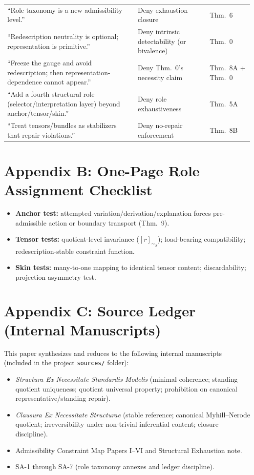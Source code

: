 \documentclass[12pt]{article}
\theoremstyle{plain}
\begin{document}
\begin{longtable}{@{}p{}p{}p{}@{}}
``Role taxonomy is a new admissibility level.'' & Deny exhaustion closure & Thm.\ 6\\
``Redescription neutrality is optional; representation is primitive.'' & Deny intrinsic detectability (or bivalence) & Thm.\ 0\\
``Freeze the gauge and avoid redescription; then representation-dependence cannot appear.'' & Deny Thm.\ 0's necessity claim & Thm.\ 8A + Thm.\ 0\\
``Add a fourth structural role (selector/interpretation layer) beyond anchor/tensor/skin.'' & Deny role exhaustiveness & Thm.\ 5A\\
``Treat tensors/bundles as stabilizers that repair violations.'' & Deny no-repair enforcement & Thm.\ 8B\\
\bottomrule
\end{longtable}

\section{Appendix B: One-Page Role Assignment Checklist}

\begin{itemize}[leftmargin=*]
\item \textbf{Anchor test:} attempted variation/derivation/explanation forces pre-admissible action or boundary transport (Thm.\ 9).
\item \textbf{Tensor tests:} quotient-level invariance ($[r]_{\sim_S}$); load-bearing compatibility; redescription-stable constraint function.
\item \textbf{Skin tests:} many-to-one mapping to identical tensor content; discardability; projection asymmetry test.
\end{itemize}

\section{Appendix C: Source Ledger (Internal Manuscripts)}

This paper synthesizes and reduces to the following internal manuscripts (included in the project \texttt{sources/} folder):

\begin{itemize}[leftmargin=*]
\item \textit{Structura Ex Necessitate Standardis Modelis} (minimal coherence; standing quotient uniqueness; quotient universal property; prohibition on canonical representative/standing repair).
\item \textit{Clausura Ex Necessitate Structurae} (stable reference; canonical Myhill--Nerode quotient; irreversibility under non-trivial inferential content; closure discipline).
\item Admissibility Constraint Map Papers I--VI and Structural Exhaustion note.
\item SA-1 through SA-7 (role taxonomy annexes and ledger discipline).
\end{itemize}
\end{document}
